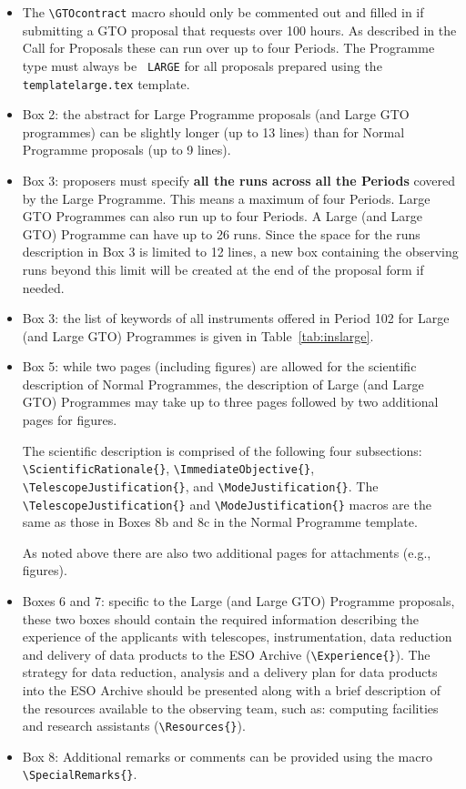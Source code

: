 \documentclass{article}
\begin{document}
\begin{itemize}
\item The \verb|\GTOcontract| macro should only be commented out and filled in if 
  submitting a GTO proposal that requests over 100 hours. As described in the Call for 
  Proposals these can run over up to four Periods. The Programme type must always be {\tt 
  LARGE} for all proposals prepared using the {\tt templatelarge.tex} template. 
\item Box 2: the abstract for Large Programme proposals (and Large GTO programmes) can be
  slightly longer (up to 13 lines) than for Normal Programme proposals
  (up to 9 lines).  
\item Box 3: proposers must specify {\bf all the runs across all the
  Periods} covered by the Large Programme. This means a maximum of four Periods. Large GTO 
  Programmes can also run up to four Periods. A Large (and Large GTO) Programme can have  
  up to 26 runs. Since the space for the runs
  description in Box 3 is limited to 12 lines, a new box containing
  the observing runs beyond this limit will be created at the end of
  the proposal form if needed.
\item Box 3: the list of keywords of all instruments offered in Period
  102 for Large (and Large GTO) Programmes is given in
  Table~\ref{tab:inslarge}.
\item Box 5: while two pages (including figures) are allowed for the scientific
  description of Normal Programmes, the
  description of Large (and Large GTO) Programmes may take up to three pages followed by
  two additional pages for figures.

  The scientific description is comprised of the following four subsections:
  \verb|\ScientificRationale{}|,
  \verb|\ImmediateObjective{}|, \verb|\TelescopeJustification{}|, and 
  \verb|\ModeJustification{}|.  
  The \linebreak \verb|\TelescopeJustification{}| and \verb|\ModeJustification{}|
  macros are the same as those in Boxes 8b and 8c in the Normal Programme
  template.
  
  As noted above there are also two additional pages for
  attachments (e.g., figures). 
\item Boxes 6 and 7: specific to the Large (and Large GTO) Programme proposals, these
  two boxes should contain the required information describing the
  experience of the applicants with telescopes, instrumentation, 
  data reduction  and delivery of data products to the ESO Archive 
  (\verb|\Experience{}|). The strategy for data reduction, analysis 
  and a delivery plan for data products into the ESO Archive should 
  be presented along with a brief description of the resources available
  to the observing team, such as: computing facilities and research
  assistants (\verb|\Resources{}|).
\item Box 8: Additional remarks or comments can be provided using
  the macro \verb|\SpecialRemarks{}|.
\end{itemize} 
\end{document}

